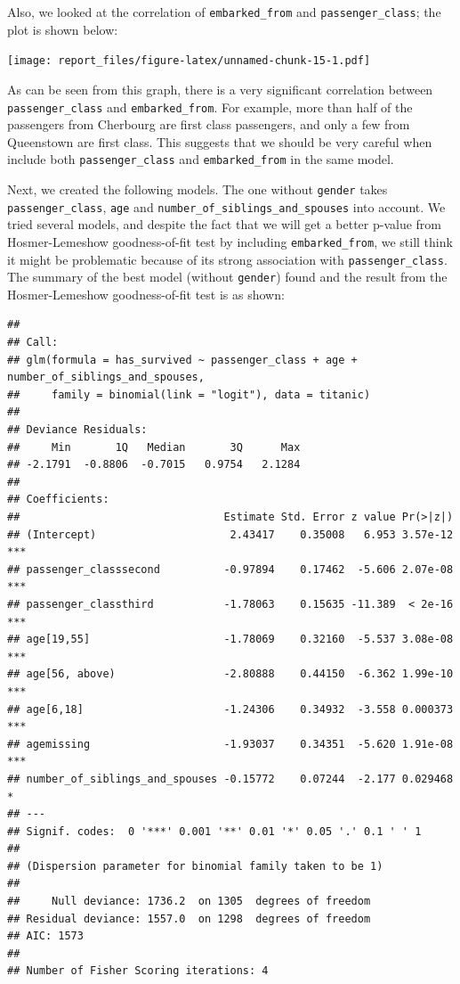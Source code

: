 \documentclass[12pt, oneside]{book}
\theoremstyle{definition}
\theoremstyle{definition}
\theoremstyle{definition}
\theoremstyle{remark}
\begin{document}
Also, we looked at the correlation of \texttt{embarked\_from} and
\texttt{passenger\_class}; the plot is shown below:

\texttt{[image: report\_files/figure-latex/unnamed-chunk-15-1.pdf]}

As can be seen from this graph, there is a very significant correlation
between \texttt{passenger\_class} and \texttt{embarked\_from}. For
example, more than half of the passengers from Cherbourg are first class
passengers, and only a few from Queenstown are first class. This
suggests that we should be very careful when include both
\texttt{passenger\_class} and \texttt{embarked\_from} in the same model.

Next, we created the following models. The one without \texttt{gender}
takes \texttt{passenger\_class}, \texttt{age} and
\texttt{number\_of\_siblings\_and\_spouses} into account. We tried
several models, and despite the fact that we will get a better p-value
from Hosmer-Lemeshow goodness-of-fit test by including
\texttt{embarked\_from}, we still think it might be problematic because
of its strong association with \texttt{passenger\_class}. The summary of
the best model (without \texttt{gender}) found and the result from the
Hosmer-Lemeshow goodness-of-fit test is as shown:

\begin{verbatim}
## 
## Call:
## glm(formula = has_survived ~ passenger_class + age + number_of_siblings_and_spouses, 
##     family = binomial(link = "logit"), data = titanic)
## 
## Deviance Residuals: 
##     Min       1Q   Median       3Q      Max  
## -2.1791  -0.8806  -0.7015   0.9754   2.1284  
## 
## Coefficients:
##                                Estimate Std. Error z value Pr(>|z|)    
## (Intercept)                     2.43417    0.35008   6.953 3.57e-12 ***
## passenger_classsecond          -0.97894    0.17462  -5.606 2.07e-08 ***
## passenger_classthird           -1.78063    0.15635 -11.389  < 2e-16 ***
## age[19,55]                     -1.78069    0.32160  -5.537 3.08e-08 ***
## age[56, above)                 -2.80888    0.44150  -6.362 1.99e-10 ***
## age[6,18]                      -1.24306    0.34932  -3.558 0.000373 ***
## agemissing                     -1.93037    0.34351  -5.620 1.91e-08 ***
## number_of_siblings_and_spouses -0.15772    0.07244  -2.177 0.029468 *  
## ---
## Signif. codes:  0 '***' 0.001 '**' 0.01 '*' 0.05 '.' 0.1 ' ' 1
## 
## (Dispersion parameter for binomial family taken to be 1)
## 
##     Null deviance: 1736.2  on 1305  degrees of freedom
## Residual deviance: 1557.0  on 1298  degrees of freedom
## AIC: 1573
## 
## Number of Fisher Scoring iterations: 4
\end{verbatim}
\end{document}
